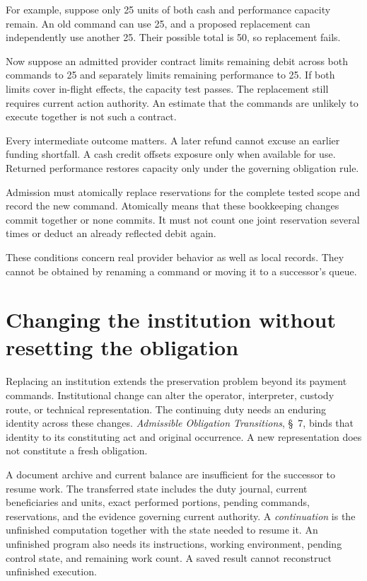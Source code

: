 \documentclass{momentum}
\begin{document}
For example, suppose only 25 units of both cash and performance capacity remain. An old command can use 25, and a proposed replacement can independently use another 25. Their possible total is 50, so replacement fails.

Now suppose an admitted provider contract limits remaining debit across both commands to 25 and separately limits remaining performance to 25. If both limits cover in-flight effects, the capacity test passes. The replacement still requires current action authority. An estimate that the commands are unlikely to execute together is not such a contract.

Every intermediate outcome matters. A later refund cannot excuse an earlier funding shortfall. A cash credit offsets exposure only when available for use. Returned performance restores capacity only under the governing obligation rule.

Admission must atomically replace reservations for the complete tested scope and record the new command. Atomically means that these bookkeeping changes commit together or none commits. It must not count one joint reservation several times or deduct an already reflected debit again.

These conditions concern real provider behavior as well as local records. They cannot be obtained by renaming a command or moving it to a successor's queue.

\section{Changing the institution without resetting the obligation}

Replacing an institution extends the preservation problem beyond its payment commands. Institutional change can alter the operator, interpreter, custody route, or technical representation. The continuing duty needs an enduring identity across these changes. \emph{Admissible Obligation Transitions}, \S~7, binds that identity to its constituting act and original occurrence. A new representation does not constitute a fresh obligation.

A document archive and current balance are insufficient for the successor to resume work. The transferred state includes the duty journal, current beneficiaries and units, exact performed portions, pending commands, reservations, and the evidence governing current authority. A \emph{continuation} is the unfinished computation together with the state needed to resume it. An unfinished program also needs its instructions, working environment, pending control state, and remaining work count. A saved result cannot reconstruct unfinished execution.
\end{document}
